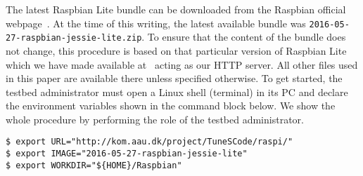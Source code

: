 
The latest Raspbian Lite bundle can be downloaded from the Raspbian
official webpage~\cite{raspbian}. At the time of this writing, the latest
available bundle was \texttt{2016-05-27-raspbian-jessie-lite.zip}.
To ensure that the content of the bundle does not change, this procedure
is based on that particular version of Raspbian Lite which we have
made available at~\cite{tunescode_webpage} acting as our \ac{HTTP} server.
All other files used in this paper are available there unless specified
otherwise. To get started, the testbed administrator must open a Linux
shell (terminal) in its \ac{PC} and declare the environment variables shown
in the command block below. We show the whole procedure by performing the role
of the testbed administrator.



\begin{lstlisting}[]
$ export URL="http://kom.aau.dk/project/TuneSCode/raspi/"
$ export IMAGE="2016-05-27-raspbian-jessie-lite"
$ export WORKDIR="${HOME}/Raspbian"
\end{lstlisting}
\FloatBarrier
\vspace{-5mm}

